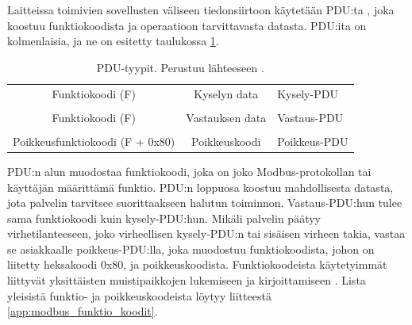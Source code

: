     Laitteissa toimivien sovellusten väliseen tiedonsiirtoon käytetään \gls{PDU}:ta , joka koostuu funktiokoodista ja operaatioon tarvittavasta datasta. \gls{PDU}:ita on kolmenlaisia, ja ne on esitetty taulukossa \ref{pdu}.
    \begin{table}[h]
      \centering
      \caption[\gls{PDU}-tyypit.]{\gls{PDU}-tyypit. Perustuu lähteeseen \parencite{modbusAppSpec}.}
      \begin{tabular}{ccl}
      \cline{1-2}
      \multicolumn{1}{|c|}{\cellcolor[HTML]{5CB735}Funktiokoodi (F)}                & \multicolumn{1}{c|}{\cellcolor[HTML]{5CB735}Kyselyn data}    & Kysely-PDU   \\ \cline{1-2}
                                                                                    &                                                              &              \\ \cline{1-2}
      \multicolumn{1}{|c|}{\cellcolor[HTML]{5CB735}Funktiokoodi (F)}                & \multicolumn{1}{c|}{\cellcolor[HTML]{5CB735}Vastauksen data} & Vastaus-PDU  \\ \cline{1-2}
                                                                                    &                                                              &              \\ \cline{1-2}
      \multicolumn{1}{|c|}{\cellcolor[HTML]{D78989}Poikkeusfunktiokoodi (F + 0x80)} & \multicolumn{1}{c|}{\cellcolor[HTML]{D78989}Poikkeuskoodi}   & Poikkeus-PDU \\ \cline{1-2}
    \end{tabular}
      \label{pdu}
    \end{table}

    \gls{PDU}:n alun muodostaa funktiokoodi, joka on joko Modbus-protokollan tai käyttäjän määrittämä funktio. PDU:n loppuosa koostuu mahdollisesta datasta, jota palvelin tarvitsee suorittaakseen halutun toiminnon. Vastaus-PDU:hun tulee sama funktiokoodi kuin kysely-PDU:hun. Mikäli palvelin päätyy virhetilanteeseen, joko virheellisen kysely-PDU:n tai sisäisen virheen takia, vastaa se asiakkaalle poikkeus-PDU:lla, joka muodostuu funktiokoodista, johon on liitetty heksakoodi 0x80, ja poikkeuskoodista. \parencite{modbusAppSpec} Funktiokoodeista käytetyimmät liittyvät yksittäisten muistipaikkojen lukemiseen ja kirjoittamiseen \parencite{DincerRosen}. Lista yleisistä funktio- ja poikkeuskoodeista löytyy liitteestä \ref{app:modbus_funktio_koodit}.



